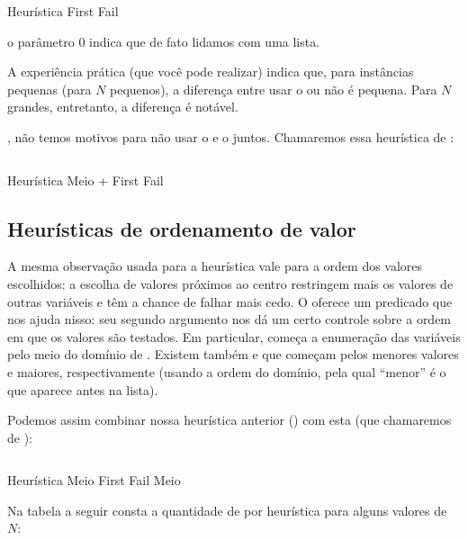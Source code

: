 \documentclass{article}
\begin{document}
    \begin{listing}
    \inputminted{prolog}{../Exemplos/Cap11/prog4_queensHeurFrstFail.ecl}
    \caption{Heurística First Fail}
    \end{listing}

\noindent o parâmetro 0 indica que de fato lidamos com uma lista.

A experiência prática (que você pode realizar) indica que, para instâncias pequenas (para $N$ pequenos), a diferença entre usar
o  ou não é pequena. Para $N$ grandes, entretanto, a diferença é notável.

 , não temos motivos  para não usar o  e o
 juntos. Chamaremos essa heurística de :

    \begin{listing}
    \inputminted{prolog}{../Exemplos/Cap11/prog5_queensHeurMoff.ecl}
    \caption{Heurística Meio + First Fail}
    \end{listing}

\subsection{Heurísticas de ordenamento de valor}

A mesma observação usada para a heurística  vale para a ordem dos valores
escolhidos: a escolha de valores próximos ao centro restringem mais os valores de outras variáveis e
têm a chance de falhar mais cedo. O \eclipse oferece um predicado  que nos ajuda
nisso: seu segundo argumento nos dá um certo controle sobre a ordem em que os valores são testados.
Em particular,  começa a enumeração das variáveis pelo meio do domínio
de . Existem também  e  que começam
pelos menores valores e maiores, respectivamente (usando a ordem do domínio, pela qual ``menor'' é o
que aparece antes na lista).

Podemos assim combinar nossa heurística anterior () com esta (que chamaremos de
):

    \begin{listing}[H]
    \inputminted{prolog}{../Exemplos/Cap11/prog6_queensHeurMoffMo.ecl}
    \caption{Heurística Meio First Fail Meio}
    \end{listing}

Na tabela a seguir consta a quantidade de  por heurística para alguns
valores de $N$:
\end{document}

